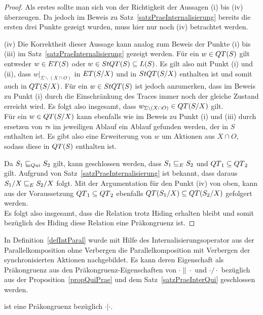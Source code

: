 \begin{proof}
  Als erstes sollte man sich von der Richtigkeit der Aussagen (i) bis (iv)
  überzeugen. Da jedoch im Beweis zu Satz~\ref{satzPraeInternalisierung}
  bereits die ersten drei Punkte gezeigt wurden, muss hier nur noch (iv)
  betrachtet werden.

  (iv)
  Die Korrektheit dieser Aussage kann analog zum Beweis der Punkte (i) bis
  (iii) im Satz~\ref{satzPraeInternalisierung} gezeigt werden. Für ein $w\in
  QT{}(S)$ gilt entweder $w\in ET{}(S)$ oder $w\in StQT{}(S)\subseteq L(S)$. Es
  gilt also mit Punkt (i) und (ii), dass $w|_{\Sigma\backslash (X\cap O)}$ in
  $ET{}(S/X)$ und in $StQT{}(S/X)$ enthalten ist und somit auch in
  $QT{}(S/X)$. Für ein $w\in StQT{}(S)$ ist jedoch anzumerken, dass im Beweis
  zu Punkt (i) durch die Einschränkung des Traces immer noch der gleiche
  Zustand erreicht wird. Es folgt also insgesamt, dass $w _{\Sigma\backslash
  (X\cap O)}\in QT{}(S/X)$ gilt.\\
  Für ein $w\in QT{}(S/X)$ kann ebenfalls wie im Beweis zu Punkt (i) und (iii)
  durch ersetzen von $\tau$s im jeweiligen Ablauf ein Ablauf gefunden werden,
  der in $S$ enthalten ist. Es gibt also eine Erweiterung von $w$ um Aktionen
  aus $X\cap O$, sodass diese in $QT{}(S)$ enthalten ist.

  Da $S_1\sqsubseteq _{Qui} S_2$ gilt, kann geschlossen werden, dass $S_1\sqsubseteq _E S_2$ und
  $QT{}_1\subseteq QT{}_2$ gilt. Aufgrund von
  Satz~\ref{satzPraeInternalisierung} ist bekannt, dass daraus $S_1/X\sqsubseteq _E
  S_2/X$ folgt. Mit der Argumentation für den Punkt (iv) von oben, kann aus der
  Voraussetzung $QT{}_1\subseteq QT{}_2$ ebenfalls $QT{}(S_1/X)\subseteq
  QT{}(S_2/X)$ gefolgert werden.\\
  Es folgt also insgesamt, dass die Relation \QRel{} trotz Hiding erhalten
  bleibt und somit bezüglich des Hiding diese Relation eine Präkongruenz ist.
\end{proof}

In Definition~\ref{defIntParal} wurde mit Hilfe des Internalisierungsoperator
aus der Parallelkomposition ohne Verbergen die Parallelkomposition mit
Verbergen der synchronisierten Aktionen nachgebildet. Es kann deren
Eigenschaft als Präkongruenz aus den Präkongruenz-Eigenschaften von
$\cdot\|\cdot$ und $\cdot /\cdot$ bezüglich \QRel{} aus der
Proposition~\ref{propQuiPrae} und dem Satz~\ref{satzPraeInterQui} geschlossen
werden.

\begin{kor}
  \QRel{} ist eine Präkongruenz bezüglich $\cdot |\cdot$.
\end{kor}

